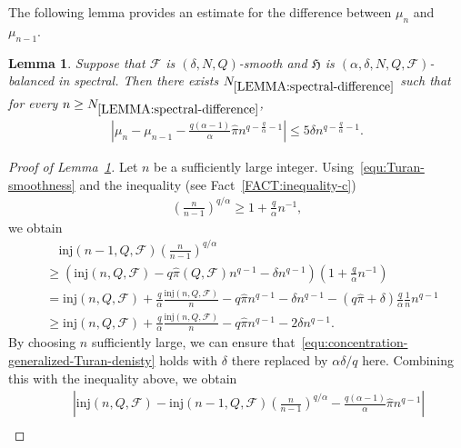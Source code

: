 \documentclass[11pt,a4paper]{article}
\newtheorem{lemma}[definition]{Lemma}
\begin{document}
The following lemma provides an estimate for the difference between $\mu_n$ and $\mu_{n-1}$.
%
\begin{lemma}\label{LEMMA:spectral-difference}
    Suppose that $\mathcal{F}$ is $(\delta, N, Q)$-smooth and $\mathfrak{H}$ is $(\alpha, \delta, N, Q, \mathcal{F})$-balanced in spectral. 
    Then there exists $N_{\ref{LEMMA:spectral-difference}}$ such that for every $n \ge N_{\ref{LEMMA:spectral-difference}}$,
    \begin{align}\label{equ:Assumption-spectral-smooth}
        \left| \mu_{n} - \mu_{n-1} - \frac{q(\alpha-1)}{\alpha} \hat{\pi} n^{q-\frac{q}{\alpha}-1}\right|
        \le 5 \delta n^{q-\frac{q}{\alpha}-1}. 
    \end{align}
\end{lemma}
\begin{proof}[Proof of Lemma~\ref{LEMMA:spectral-difference}]
    Let $n$ be a sufficiently large integer. 
    Using~\eqref{equ:Turan-smoothness} and the inequality (see Fact~\ref{FACT:inequality-c})
    \begin{align*}
        \left(\frac{n}{n-1}\right)^{q/\alpha} 
        \ge 1 + \frac{q}{\alpha} n^{-1}, 
    \end{align*}
    we obtain 
    \begin{align*}
        & \quad \mathrm{inj}(n-1,Q,\mathcal{F}) \left(\frac{n}{n-1}\right)^{q/\alpha} \\
        & \ge \left(\mathrm{inj}(n,Q,\mathcal{F}) - q \hat{\pi}(Q,\mathcal{F}) n^{q-1} - \delta n^{q-1}\right) \left(1 + \frac{q}{\alpha} n^{-1} \right) \\
        & = \mathrm{inj}(n,Q,\mathcal{F}) + \frac{q}{\alpha} \frac{\mathrm{inj}(n,Q,\mathcal{F})}{n} - q \hat{\pi} n^{q-1} -\delta n^{q-1} - \left(q \hat{\pi}+\delta\right) \frac{q}{\alpha} \frac{1}{n} n^{q-1} \\
        & \ge \mathrm{inj}(n,Q,\mathcal{F}) + \frac{q}{\alpha} \frac{\mathrm{inj}(n,Q,\mathcal{F})}{n} - q \hat{\pi} n^{q-1} - 2 \delta n^{q-1}. 
    \end{align*}
    By choosing $n$ sufficiently large, we can ensure that~\eqref{equ:concentration-generalized-Turan-denisty} holds with $\delta$ there replaced by $\alpha \delta/q$ here. Combining this with the inequality above, we obtain
    \begin{align*}
        & \quad \left|\mathrm{inj}(n,Q,\mathcal{F}) - \mathrm{inj}(n-1,Q,\mathcal{F}) \left(\frac{n}{n-1}\right)^{q/\alpha} - \frac{q(\alpha-1)}{\alpha} \hat{\pi} n^{q-1}\right| \\

\end{align*}
\end{proof}
\end{document}
